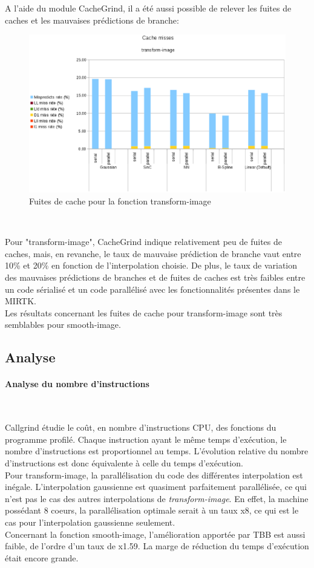 \documentclass[10pt]{report}
\begin{document}
A l'aide du module CacheGrind, il a été aussi possible de relever les fuites de caches et les mauvaises prédictions de branche:

\begin{figure}[h!]
	\begin{center}
		\includegraphics[width=15cm]{Reports/figures/cache_misses_transform_image.eps}
	\end{center}	
	\caption{Fuites de cache pour la fonction transform-image}
	\label{Fuites de cache pour la fonction transform-image}
\end{figure}~\par
Pour "transform-image", CacheGrind indique relativement peu de fuites de caches, mais, en revanche, le taux de mauvaise prédiction de branche vaut entre 10\% et 20\% en fonction de l'interpolation choisie. De plus, le taux de variation des mauvaises prédictions de branches et de fuites de caches est très faibles entre un code sérialisé et un code parallélisé avec les fonctionnalités présentes dans le MIRTK.\\
Les résultats concernant les fuites de cache pour transform-image sont très semblables pour smooth-image.
\subsection{Analyse}
    \paragraph{Analyse du nombre d'instructions}~\par
Callgrind étudie le coût, en nombre d'instructions CPU, des fonctions du programme profilé. Chaque instruction ayant le même temps d'exécution, le nombre d'instructions est proportionnel au temps. L'évolution relative du nombre d'instructions est donc équivalente à celle du temps d'exécution.\\
Pour transform-image, la parallélisation du code des différentes interpolation est inégale. L'interpolation gaussienne est quasiment parfaitement parallélisée, ce qui n'est pas le cas des autres interpolations de \textit{transform-image}. En effet, la machine possédant 8 coeurs, la parallélisation optimale serait à un taux x8, ce qui est le cas pour l'interpolation gaussienne seulement.\\
Concernant la fonction smooth-image, l'amélioration apportée par TBB est aussi faible, de l'ordre d'un taux de x1.59. La marge de réduction du temps d'exécution était encore grande.
\newpage
\end{document}
